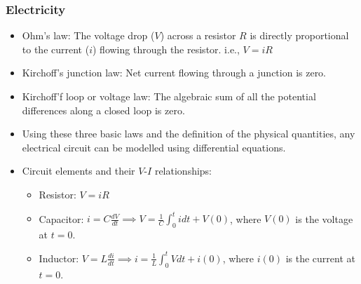 \documentclass[10pt]{beamer}
\begin{document}
\begin{frame}
    \fontsize{9pt}{10pt}\selectfont
    \frametitle{Electricity}
    \begin{itemize}
        \item Ohm's law: The voltage drop ($V$) across a resistor $R$ is directly proportional to the current ($i$) flowing through the resistor. i.e., $V = iR$
        \item Kirchoff's junction law: Net current flowing through a junction is zero.
        \item Kirchoff'f loop or voltage law: The algebraic sum of all the potential differences along a closed loop is zero.
        \item Using these three basic laws and the definition of the physical quantities, any electrical circuit can be modelled using differential equations.
        \item Circuit elements and their $V$-$I$ relationships:
            \begin{itemize}
                \item Resistor: $V = iR$
                \item Capacitor: $i = C \frac{dV}{dt} \implies V = \frac{1}{C}\int_{0}^{t} i dt + V(0)$, where $V(0)$ is the voltage at $t = 0$.
                \item Inductor: $V = L \frac{di}{dt}\implies i = \frac{1}{L}\int_{0}^{t} V dt + i(0)$, where $i(0)$ is the current at $t = 0$.
            \end{itemize}
    \end{itemize}
\end{frame}
\end{document}
